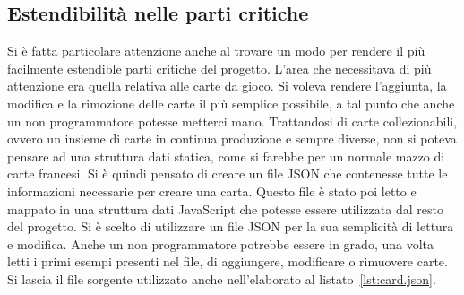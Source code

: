 \subsection{Estendibilità nelle parti critiche}
Si è fatta particolare attenzione anche al trovare un modo per rendere il più facilmente estendible parti critiche del progetto. L'area che necessitava di più attenzione era quella
relativa alle carte da gioco. Si voleva rendere l'aggiunta, la modifica e la rimozione delle carte il più semplice possibile, a tal punto che anche un non programmatore potesse 
metterci mano. Trattandosi di carte collezionabili, ovvero un insieme di carte in continua produzione e sempre diverse, non si poteva pensare ad una struttura dati statica, come si 
farebbe per un normale mazzo di carte francesi. Si è quindi pensato di creare un file JSON che contenesse tutte le informazioni necessarie per creare una carta. Questo file è stato
poi letto e mappato in una struttura dati JavaScript che potesse essere utilizzata dal resto del progetto. Si è scelto di utilizzare un file JSON per la sua semplicità di lettura e
modifica. Anche un non programmatore potrebbe essere in grado, una volta letti i primi esempi presenti nel file, di aggiungere, modificare o rimuovere carte. Si lascia il
file sorgente utilizzato anche nell'elaborato al listato~\ref{lst:card.json}.
